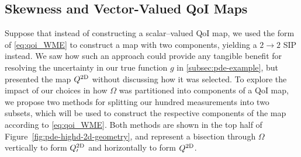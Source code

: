\FloatBarrier
\subsection{Skewness and Vector-Valued QoI Maps}

Suppose that instead of constructing a scalar--valued QoI map, we used the form of \eqref{eq:qoi_WME} to construct a map with two components, yielding a $2 \rightarrow 2$ SIP instead.
We saw how such an approach could provide any tangible benefit for resolving the uncertainty in our true function $g$ in \ref{subsec:pde-example}, but presented the map $Q^\text{2D}$ without discussing how it was selected.
To explore the impact of our choices in how $\Omega$ was partitioned into components of a QoI map, we propose two methods for splitting our hundred measurements into two subsets, which will be used to construct the respective components of the map according to \eqref{eq:qoi_WME}.
Both methods are shown in the top half of Figure~\ref{fig:pde-highd-2d-geometry}, and represent a bisection through $\Omega$ vertically to form $Q^\text{2D}_\prime$ and horizontally to form $Q^\text{2D}$.


